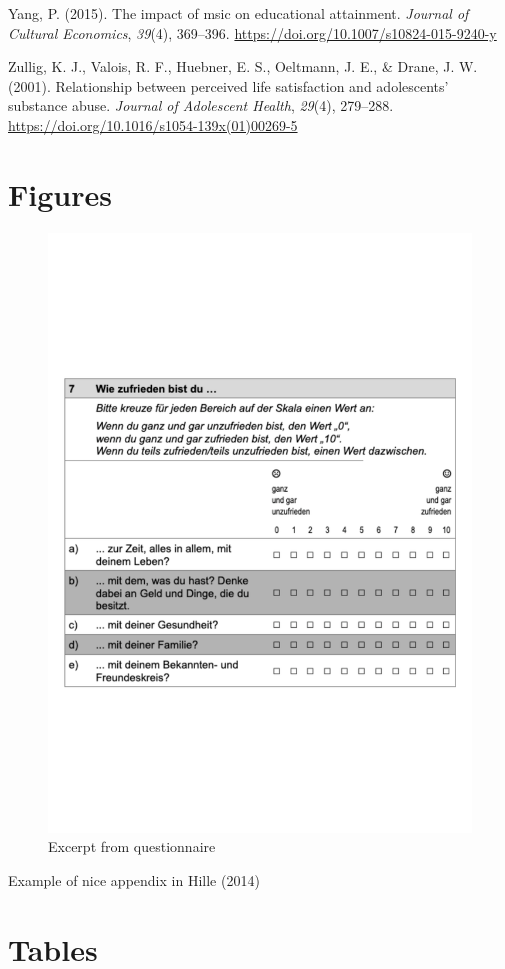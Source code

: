 \documentclass[a4, 12pt]{article}
\begin{document}
\leavevmode\hypertarget{ref-Yang2015}{}%
Yang, P. (2015). The impact of msic on educational attainment. \emph{Journal of Cultural Economics}, \emph{39}(4), 369--396. \url{https://doi.org/10.1007/s10824-015-9240-y}

\leavevmode\hypertarget{ref-Zullig2001}{}%
Zullig, K. J., Valois, R. F., Huebner, E. S., Oeltmann, J. E., \& Drane, J. W. (2001). Relationship between perceived life satisfaction and adolescents' substance abuse. \emph{Journal of Adolescent Health}, \emph{29}(4), 279--288. \url{https://doi.org/10.1016/s1054-139x(01)00269-5}

\clearpage

\hypertarget{appendix-appendix}{%
\appendix}


\hypertarget{figures}{%
\section{Figures}\label{figures}}

\begin{figure}
\includegraphics[width=1\linewidth]{../figures/Wie zufrieden bist du....pdf} \caption{Excerpt from questionnaire}\label{fig:questionnaire}
\end{figure}

Example of nice appendix in Hille (2014)

\clearpage

\hypertarget{tables}{%
\section{Tables}\label{tables}}
\end{document}
